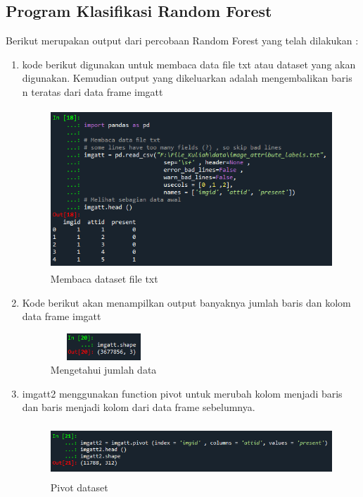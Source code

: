 \subsection{Program Klasifikasi Random Forest}
Berikut merupakan output dari percobaan Random Forest yang telah dilakukan :
\begin{enumerate}
    \item kode berikut digunakan untuk membaca data file txt atau dataset yang akan digunakan. Kemudian output yang dikeluarkan adalah mengembalikan baris n teratas dari data frame imgatt
    \begin{figure}[!htbp]
        \centering
        \includegraphics[width=12cm,height=6cm]{figures/read_randomforesttxt.png}
        \caption{Membaca dataset file txt}
        \label{penanda}
    \end{figure} 

    \item Kode berikut akan menampilkan output banyaknya jumlah baris dan kolom data frame imgatt
    \begin{figure}[!htbp]
        \centering
        \includegraphics[width=4cm,height=1cm]{figures/shape_rf.png}
        \caption{Mengetahui jumlah data}
        \label{penanda}
    \end{figure} 

    \item imgatt2 menggunakan function pivot untuk merubah kolom menjadi baris dan baris menjadi kolom dari data frame sebelumnya. 
    \begin{figure}[!htbp]
        \centering
        \includegraphics[width=12cm,height=2cm]{figures/pivot_rf.png}
        \caption{Pivot dataset}
        \label{penanda}
    \end{figure}


\end{enumerate}
